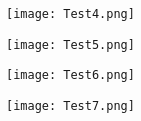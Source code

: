 \begin{figure}[H]
	\centering
	\texttt{[image: Test4.png]}
	\label{fig:Test4}
\end{figure}

\begin{figure}[H]
	\centering
	\texttt{[image: Test5.png]}
	\label{fig:Test5}
\end{figure}

\begin{figure}[H]
	\centering
	\texttt{[image: Test6.png]}
	\label{fig:Test6}
\end{figure}

\begin{figure}[H]
	\centering
	\texttt{[image: Test7.png]}
	\label{fig:Test7}
\end{figure}
